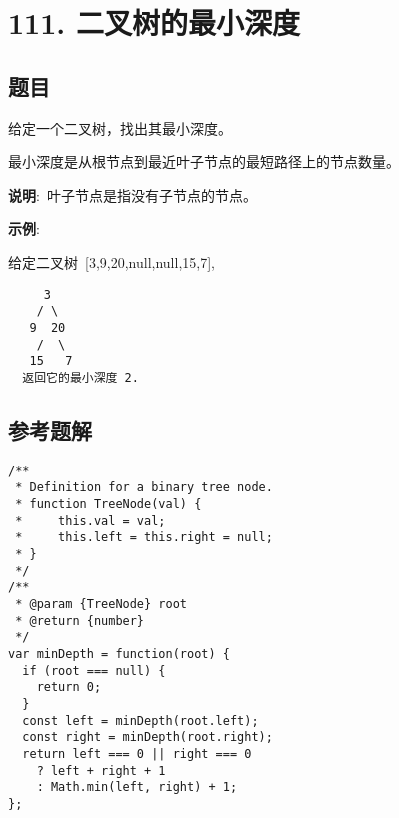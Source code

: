 \newpage
\section{111. 二叉树的最小深度}
\label{leetcode:111}

\subsection{题目}

给定一个二叉树，找出其最小深度。

最小深度是从根节点到最近叶子节点的最短路径上的节点数量。

\textbf{说明}: 叶子节点是指没有子节点的节点。

\textbf{示例}:

给定二叉树 [3,9,20,null,null,15,7],

\begin{verbatim}
     3
    / \
   9  20
    /  \
   15   7
  返回它的最小深度 2.
\end{verbatim}

\subsection{参考题解}

\begin{verbatim}
/**
 * Definition for a binary tree node.
 * function TreeNode(val) {
 *     this.val = val;
 *     this.left = this.right = null;
 * }
 */
/**
 * @param {TreeNode} root
 * @return {number}
 */
var minDepth = function(root) {
  if (root === null) {
    return 0;
  }
  const left = minDepth(root.left);
  const right = minDepth(root.right);
  return left === 0 || right === 0
    ? left + right + 1
    : Math.min(left, right) + 1;
};
\end{verbatim}
